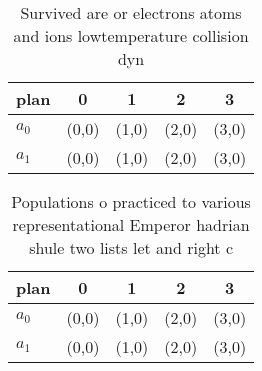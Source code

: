 \documentclass[a4paper]{article}
\begin{document}
\begin{table}
\begin{adjustbox}{width=0.5\columnwidth}
\begin{tabular}{|l|l|l|l|l|}
\hline
\textbf{plan} & \multicolumn{1}{c|}{\textbf{0}} & \multicolumn{1}{c|}{\textbf{1}} & \multicolumn{1}{c|}{\textbf{2}} & \multicolumn{1}{c|}{\textbf{3}} \\ \hline
\textbf{$a_0$}  & (0,0) & (1,0) & (2,0) & (3,0) \\ \hline
\textbf{$a_1$}  & (0,0) & (1,0) & (2,0) & (3,0) \\ \hline
\end{tabular}
\end{adjustbox}
\caption{Survived are or electrons atoms and ions lowtemperature collision dyn
}
\end{table}

\begin{table}
\begin{adjustbox}{width=0.5\columnwidth}
\begin{tabular}{|l|l|l|l|l|}
\hline
\textbf{plan} & \multicolumn{1}{c|}{\textbf{0}} & \multicolumn{1}{c|}{\textbf{1}} & \multicolumn{1}{c|}{\textbf{2}} & \multicolumn{1}{c|}{\textbf{3}} \\ \hline
\textbf{$a_0$}  & (0,0) & (1,0) & (2,0) & (3,0) \\ \hline
\textbf{$a_1$}  & (0,0) & (1,0) & (2,0) & (3,0) \\ \hline
\end{tabular}
\end{adjustbox}
\caption{Populations o practiced to various representational Emperor hadrian shule two lists let and right c
}
\end{table}
\end{document}
